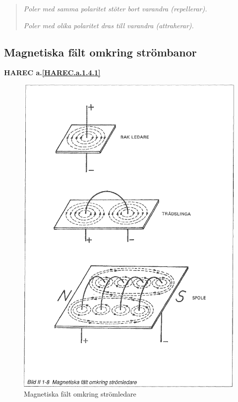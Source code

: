 \begin{quote}
\emph{Poler med samma polaritet stöter bort varandra (repellerar).}

\emph{Poler med olika polaritet dras till varandra (attraherar).}
\end{quote}

\subsection{Magnetiska fält omkring strömbanor}
\textbf{HAREC a.\ref{HAREC.a.1.4.1}\label{myHAREC.a.1.4.1}}

\begin{figure}
\begin{center}
\includegraphics[width=14cm]{images/bild_2_1-08}
\caption{Magnetiska fält omkring strömledare}
\label{fig:BildII1-8}
\end{center}
\end{figure}

